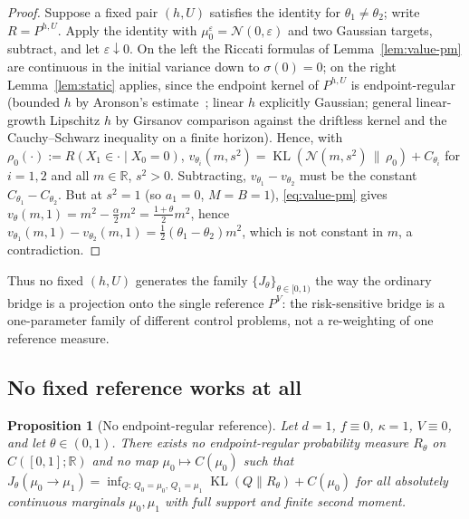 \documentclass[letterpaper,10pt,conference]{IEEEtran}
\newtheorem{proposition}{Proposition}
\newcommand{\KL}{\operatorname{KL}}
\newcommand{\RR}{\mathbb{R}}
\newcommand{\cN}{\mathcal{N}}
\begin{document}
	\begin{proof}
		Suppose a fixed pair $(h,U)$ satisfies the identity for
		$\theta_1\neq\theta_2$; write $R=P^{h,U}$. Apply the identity with
		$\mu_0^\varepsilon=\cN(0,\varepsilon)$ and two Gaussian targets, subtract,
		and let $\varepsilon\downarrow0$. On the left the Riccati formulas of
		Lemma~\ref{lem:value-pm} are continuous in the initial variance down to
		$\sigma(0)=0$; on the right Lemma~\ref{lem:static} applies, since the
		endpoint kernel of $P^{h,U}$ is endpoint-regular (bounded $h$ by Aronson's
		estimate~\cite{aronson1967}; linear $h$ explicitly Gaussian; general
		linear-growth Lipschitz $h$ by Girsanov comparison against the driftless
		kernel and the Cauchy--Schwarz inequality on a finite horizon). Hence, with
		$\rho_0(\cdot):=R(X_1\in\cdot\mid X_0=0)$,
		$v_{\theta_i}(m,s^2)=\KL(\cN(m,s^2)\,\|\,\rho_0)+C_{\theta_i}$ for $i=1,2$
		and all $m\in\RR$, $s^2>0$. Subtracting, $v_{\theta_1}-v_{\theta_2}$ must
		be the constant $C_{\theta_1}-C_{\theta_2}$. But at $s^2=1$ (so $a_1=0$, $M=B=1$),
		\eqref{eq:value-pm} gives
		$v_\theta(m,1)=m^2-\frac{\alpha}{2}m^2=\frac{1+\theta}{2}m^2$, hence
		$v_{\theta_1}(m,1)-v_{\theta_2}(m,1)=\tfrac12(\theta_1-\theta_2)m^2$, which
		is not constant in $m$, a contradiction.
	\end{proof}
	
	Thus no fixed $(h,U)$ generates the family $\{J_\theta\}_{\theta\in[0,1)}$ the
	way the ordinary bridge is a projection onto the single reference $P^V$: the
	risk-sensitive bridge is a one-parameter family of different control problems, not a re-weighting of
	one reference measure.
	
	\subsection{No fixed reference works at all}
	\begin{proposition}[No endpoint-regular reference]
		\label{prop:no-kl}
		Let $d=1$, $f\equiv0$, $\kappa=1$, $V\equiv0$, and let $\theta\in(0,1)$.
		There exists no endpoint-regular probability measure $R_\theta$ on
		$C([0,1];\RR)$ and no map $\mu_0\mapsto C(\mu_0)$ such that
		$J_\theta(\mu_0\to\mu_1)=\inf_{Q:\,Q_0=\mu_0,\,Q_1=\mu_1}\KL(Q\|R_\theta)+C(\mu_0)$
		for all absolutely continuous marginals $\mu_0,\mu_1$ with full support and
		finite second moment.
	\end{proposition}
	
\end{document}
